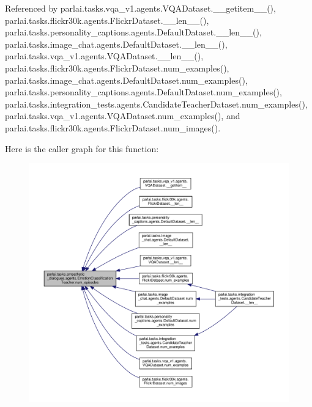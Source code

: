 Referenced by parlai.\+tasks.\+vqa\+\_\+v1.\+agents.\+V\+Q\+A\+Dataset.\+\_\+\+\_\+getitem\+\_\+\+\_\+(), parlai.\+tasks.\+flickr30k.\+agents.\+Flickr\+Dataset.\+\_\+\+\_\+len\+\_\+\+\_\+(), parlai.\+tasks.\+personality\+\_\+captions.\+agents.\+Default\+Dataset.\+\_\+\+\_\+len\+\_\+\+\_\+(), parlai.\+tasks.\+image\+\_\+chat.\+agents.\+Default\+Dataset.\+\_\+\+\_\+len\+\_\+\+\_\+(), parlai.\+tasks.\+vqa\+\_\+v1.\+agents.\+V\+Q\+A\+Dataset.\+\_\+\+\_\+len\+\_\+\+\_\+(), parlai.\+tasks.\+flickr30k.\+agents.\+Flickr\+Dataset.\+num\+\_\+examples(), parlai.\+tasks.\+image\+\_\+chat.\+agents.\+Default\+Dataset.\+num\+\_\+examples(), parlai.\+tasks.\+personality\+\_\+captions.\+agents.\+Default\+Dataset.\+num\+\_\+examples(), parlai.\+tasks.\+integration\+\_\+tests.\+agents.\+Candidate\+Teacher\+Dataset.\+num\+\_\+examples(), parlai.\+tasks.\+vqa\+\_\+v1.\+agents.\+V\+Q\+A\+Dataset.\+num\+\_\+examples(), and parlai.\+tasks.\+flickr30k.\+agents.\+Flickr\+Dataset.\+num\+\_\+images().

Here is the caller graph for this function\+:
\nopagebreak
\begin{figure}[H]
\begin{center}
\leavevmode
\includegraphics[width=350pt]{classparlai_1_1tasks_1_1empathetic__dialogues_1_1agents_1_1EmotionClassificationTeacher_acad8b18280f22798f1b0b6586e55765c_icgraph}
\end{center}
\end{figure}
\mbox{\label{classparlai_1_1tasks_1_1empathetic__dialogues_1_1agents_1_1EmotionClassificationTeacher_a2421670b1bc496fdfe555208df4452a8}} 

